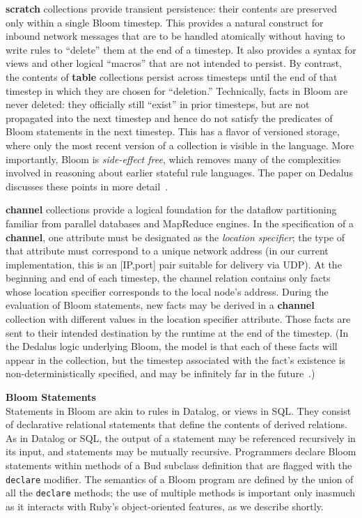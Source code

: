 {\bf scratch} collections provide transient persistence: their contents are preserved only within a single Bloom timestep.  This provides a natural construct for inbound network messages that are to be handled atomically without having to write rules to ``delete'' them at the end of a timestep.  It also provides a syntax for views and other logical ``macros'' that are not intended to persist.  By contrast, the contents of {\bf table} collections persist across timesteps until the end of that timestep in which they are chosen for ``deletion.''  Technically, facts in Bloom are never deleted: they officially still ``exist'' in prior timesteps, but are not propagated into the next timestep and hence do not satisfy the predicates of Bloom statements in the next timestep.  This has a flavor of versioned storage, where  only the most recent version of a collection is visible in the language.  More importantly, Bloom is {\em side-effect free}, which removes many of the complexities involved in reasoning about earlier stateful rule languages.  The paper on Dedalus discusses these points in more detail~\cite{dedalus-techr}.

{\bf channel} collections provide a logical foundation for the dataflow partitioning familiar from parallel databases and MapReduce engines.  In the specification of a {\bf channel}, one attribute must be designated as the {\em location specifier}; the type of that attribute must correspond to a unique network address (in our current implementation, this is an [IP,port] pair suitable for delivery via UDP).  
At the beginning and end of each timestep, the channel relation contains only facts whose location specifier corresponds to the local node's address.  During the evaluation of Bloom statements, new facts may be derived in a {\bf channel} collection with different values in the location specifier attribute.  Those facts are sent to their intended destination by the runtime at the end of the timestep.  (In the Dedalus logic underlying Bloom, the model is that each of these facts will appear in the collection, but the timestep associated with the fact's existence is non-deterministically specified, and may be infinitely far in the future~\cite{dedalus-techr}.)

{\bf Bloom Statements}\\
\noindent
Statements in Bloom are akin to rules in Datalog, or views in SQL.  They consist of declarative relational statements that define the contents of derived relations.  As in Datalog or SQL, the output of a statement may be referenced recursively in its input, and statements may be mutually recursive.  Programmers declare Bloom statements within methods of a Bud subclass definition that are flagged with the {\tt declare} modifier.  The semantics of a Bloom program are defined by the union of all the {\tt declare} methods; the use of multiple methods is important only inasmuch as it interacts with Ruby's object-oriented features, as we describe shortly.

